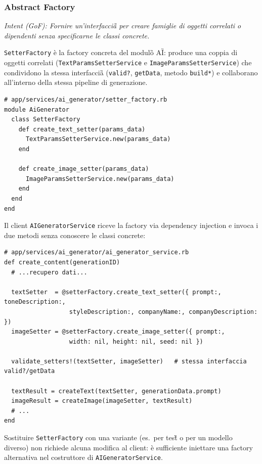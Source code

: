 \documentclass[a4paper,11pt]{article}
\newcommand{\code}[1]{\texttt{#1}}
\begin{document}
\subsubsection{Abstract Factory}

\textit{Intent (GoF): Fornire un'interfaccia\G{} per creare famiglie di oggetti correlati o
dipendenti senza specificarne le classi concrete.}

\code{SetterFactory} è la factory concreta del modulo\G{} AI\G{}: produce una coppia
di oggetti correlati (\code{TextParamsSetterService} e
\code{ImageParamsSetterService}) che condividono la stessa interfaccia\G{}
(\code{valid?}, \code{getData}, metodo \code{build*}) e collaborano all'interno
della stessa pipeline di generazione.

\begin{lstlisting}[caption={SetterFactory -- creazione della famiglia testo/immagine}]
# app/services/ai_generator/setter_factory.rb
module AiGenerator
  class SetterFactory
    def create_text_setter(params_data)
      TextParamsSetterService.new(params_data)
    end

    def create_image_setter(params_data)
      ImageParamsSetterService.new(params_data)
    end
  end
end
\end{lstlisting}

Il client \code{AIGeneratorService} riceve la factory via dependency injection
e invoca i due metodi senza conoscere le classi concrete:

\begin{lstlisting}[caption={AIGeneratorService -- utilizzo della factory senza dipendenza diretta}]
# app/services/ai_generator/ai_generator_service.rb
def create_content(generationID)
  # ...recupero dati...

  textSetter  = @setterFactory.create_text_setter({ prompt:, toneDescription:,
                  styleDescription:, companyName:, companyDescription: })
  imageSetter = @setterFactory.create_image_setter({ prompt:,
                  width: nil, height: nil, seed: nil })

  validate_setters!(textSetter, imageSetter)   # stessa interfaccia valid?/getData

  textResult = createText(textSetter, generationData.prompt)
  imageResult = createImage(imageSetter, textResult)
  # ...
end
\end{lstlisting}

Sostituire \code{SetterFactory} con una variante (es.\ per test\G{} o per un
modello diverso) non richiede alcuna modifica al client: è sufficiente
iniettare una factory alternativa nel costruttore di \code{AIGeneratorService}.
\end{document}
